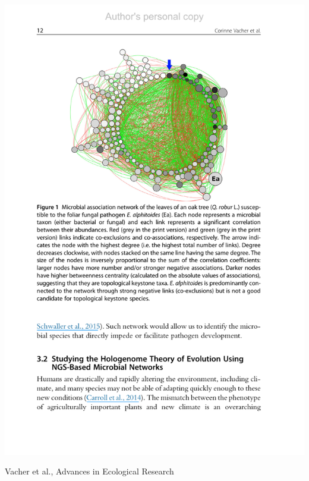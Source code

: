 \begin{frame}
\begin{columns}
\begin{column}{.55\textwidth}
      \includegraphics[width=\textwidth]{figures/cor_net_eco}
      \begin{scriptsize}
         Vacher et al., Advances in Ecological Research
      \end{scriptsize}
    \end{column}
  \end{columns}

\end{frame}


